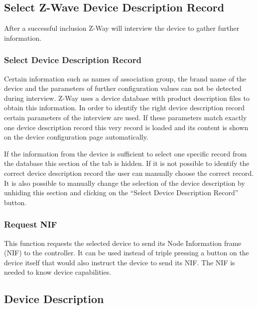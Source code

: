 \subsection{Select Z-Wave Device Description Record}

After a successful inclusion Z-Way will interview the device to gather further information.  

\subsubsection{Select Device Description Record}

Certain information such as names of association group, the brand name of the device and the parameters 
of further configuration values can not be detected during interview. Z-Way uses a device database with 
product description files to obtain this information. In order to identify the right device description 
record certain parameters of the interview are used. 
If these parameters match exactly one device description record this very record is loaded and its 
content is shown on the device configuration page automatically.

If the information from the device is sufficient to select one specific record from the database this 
section of the tab is hidden. If it is not possible to identify the correct device description record 
the user can manually choose the correct record. It is also possible to manually change the selection 
of the device description by unhiding this section and clicking on the “Select Device Description 
Record” button.

\subsubsection{Request NIF}  

This function requests the selected device to send its Node Information frame (NIF) to the controller. It 
can be used instead of triple pressing a button on the device itself that would also instruct the device 
to send its NIF. The NIF is needed to know device capabilities.


\subsection{Device Description}

